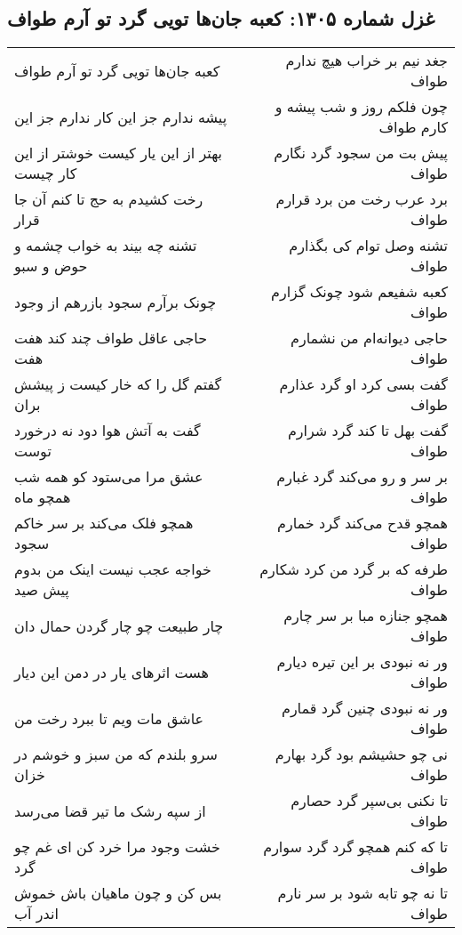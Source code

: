 \begin{center}
\section*{غزل شماره ۱۳۰۵: کعبه جان‌ها تویی گرد تو آرم طواف}
\label{sec:1305}
\begin{longtable}{l p{0.5cm} r}
کعبه جان‌ها تویی گرد تو آرم طواف
&&
جغد نیم بر خراب هیچ ندارم طواف
\\
پیشه ندارم جز این کار ندارم جز این
&&
چون فلکم روز و شب پیشه و کارم طواف
\\
بهتر از این یار کیست خوشتر از این کار چیست
&&
پیش بت من سجود گرد نگارم طواف
\\
رخت کشیدم به حج تا کنم آن جا قرار
&&
برد عرب رخت من برد قرارم طواف
\\
تشنه چه بیند به خواب چشمه و حوض و سبو
&&
تشنه وصل توام کی بگذارم طواف
\\
چونک برآرم سجود بازرهم از وجود
&&
کعبه شفیعم شود چونک گزارم طواف
\\
حاجی عاقل طواف چند کند هفت هفت
&&
حاجی دیوانه‌ام من نشمارم طواف
\\
گفتم گل را که خار کیست ز پیشش بران
&&
گفت بسی کرد او گرد عذارم طواف
\\
گفت به آتش هوا دود نه درخورد توست
&&
گفت بهل تا کند گرد شرارم طواف
\\
عشق مرا می‌ستود کو همه شب همچو ماه
&&
بر سر و رو می‌کند گرد غبارم طواف
\\
همچو فلک می‌کند بر سر خاکم سجود
&&
همچو قدح می‌کند گرد خمارم طواف
\\
خواجه عجب نیست اینک من بدوم پیش صید
&&
طرفه که بر گرد من کرد شکارم طواف
\\
چار طبیعت چو چار گردن حمال دان
&&
همچو جنازه مبا بر سر چارم طواف
\\
هست اثرهای یار در دمن این دیار
&&
ور نه نبودی بر این تیره دیارم طواف
\\
عاشق مات ویم تا ببرد رخت من
&&
ور نه نبودی چنین گرد قمارم طواف
\\
سرو بلندم که من سبز و خوشم در خزان
&&
نی چو حشیشم بود گرد بهارم طواف
\\
از سپه رشک ما تیر قضا می‌رسد
&&
تا نکنی بی‌سپر گرد حصارم طواف
\\
خشت وجود مرا خرد کن ای غم چو گرد
&&
تا که کنم همچو گرد گرد سوارم طواف
\\
بس کن و چون ماهیان باش خموش اندر آب
&&
تا نه چو تابه شود بر سر نارم طواف
\\
\end{longtable}
\end{center}
